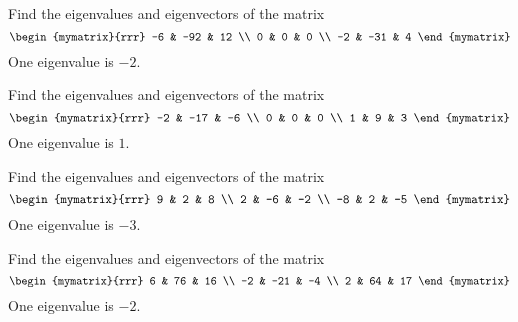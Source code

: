 \begin{enumialphparenastyle}

\begin{ex} Find the eigenvalues and eigenvectors of the matrix 
\begin{equation*}
\begin{mymatrix}{rrr}
-6 & -92 & 12 \\
0 & 0 & 0 \\
-2 & -31 & 4
\end{mymatrix}
\end{equation*}
One eigenvalue is $-2$.
\end{ex}


\begin{ex} Find the eigenvalues and eigenvectors of the matrix 
\begin{equation*}
\begin{mymatrix}{rrr}
-2 & -17 & -6 \\
0 & 0 & 0 \\
1 & 9 & 3
\end{mymatrix}
\end{equation*}
One eigenvalue is $1$. 
\end{ex}

\begin{ex} Find the eigenvalues and eigenvectors of the matrix 
\begin{equation*}
\begin{mymatrix}{rrr}
9 & 2 & 8 \\
2 & -6 & -2 \\
-8 & 2 & -5
\end{mymatrix}
\end{equation*}
One eigenvalue is $-3$. 
\end{ex}

\begin{ex} Find the eigenvalues and eigenvectors of the matrix 
\begin{equation*}
\begin{mymatrix}{rrr}
6 & 76 & 16 \\
-2 & -21 & -4 \\
2 & 64 & 17
\end{mymatrix}
\end{equation*}
One eigenvalue is $-2$. 
\end{ex}


\end{enumialphparenastyle}

